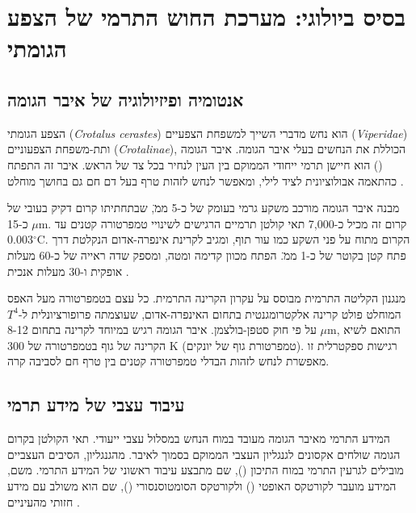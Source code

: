 
\section{בסיס ביולוגי: מערכת החוש התרמי של הצפע הגומתי}
\label{sec:ch02_bio_basis}

\subsection{אנטומיה ופיזיולוגיה של איבר הגומה}
\label{sec:ch02_pit_organ}

הצפע הגומתי (\emph{Crotalus cerastes}) הוא נחש מדברי השייך למשפחת הצפעיים (\emph{Viperidae}) ותת-משפחת הצפעוניים (\emph{Crotalinae}), הכוללת את הנחשים בעלי איבר הגומה. איבר הגומה () הוא חיישן תרמי ייחודי הממוקם בין העין לנחיר בכל צד של הראש. איבר זה התפתח כהתאמה אבולוציונית לציד לילי, ומאפשר לנחש לזהות טרף בעל דם חם גם בחושך מוחלט \cite{Simmons1979BatSonar}.

מבנה איבר הגומה מורכב משקע גרמי בעומק של כ-5 מ\"מ, שבתחתיתו קרום דקיק בעובי של כ-15 $\mu$m. קרום זה מכיל כ-7,000 תאי קולטן תרמיים הרגישים לשינויי טמפרטורה קטנים עד 0.003$^{\circ}$C. הקרום מתוח על פני השקע כמו עור תוף, ומגיב לקרינת אינפרה-אדום הנקלטת דרך פתח קטן בקוטר של כ-1 מ\"מ. הפתח מכוון קדימה ומטה, ומספק שדה ראייה של כ-60 מעלות אופקית ו-30 מעלות אנכית \cite{Schnitzler1968DSC}.

מנגנון הקליטה התרמית מבוסס על עקרון הקרינה התרמית. כל עצם בטמפרטורה מעל האפס המוחלט פולט קרינה אלקטרומגנטית בתחום האינפרה-אדום, שעוצמתה פרופורציונלית ל-$T^4$ על פי חוק סטפן-בולצמן. איבר הגומה רגיש במיוחד לקרינה בתחום 8-12 $\mu$m, התואם לשיא הקרינה של גוף בטמפרטורה של 300 K (טמפרטורת גוף של יונקים). רגישות ספקטרלית זו מאפשרת לנחש לזהות הבדלי טמפרטורה קטנים בין טרף חם לסביבה קרה.

\subsection{עיבוד עצבי של מידע תרמי}
\label{sec:ch02_neural_processing}

המידע התרמי מאיבר הגומה מעובד במוח הנחש במסלול עצבי ייעודי. תאי הקולטן בקרום הגומה שולחים אקסונים לגנגליון העצבי הממוקם בסמוך לאיבר. מהגנגליון, הסיבים העצביים מובילים לגרעין התרמי במוח התיכון (), שם מתבצע עיבוד ראשוני של המידע התרמי. משם, המידע מועבר לקורטקס האופטי () ולקורטקס הסומטוסנסורי (), שם הוא משולב עם מידע חזותי מהעיניים \cite{Schuller1974DSC}.

